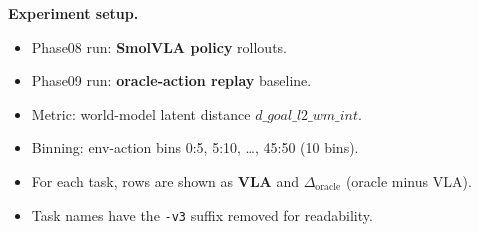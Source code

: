 
\noindent\textbf{Experiment setup.}
\begin{itemize}
\item Phase08 run: \textbf{SmolVLA policy} rollouts.
\item Phase09 run: \textbf{oracle-action replay} baseline.
\item Metric: world-model latent distance $d\_goal\_l2\_wm\_int$.
\item Binning: env-action bins 0:5, 5:10, \dots, 45:50 (10 bins).
\item For each task, rows are shown as \textbf{VLA} and \textbf{$\Delta_{\mathrm{oracle}}$} (oracle minus VLA).
\item Task names have the \texttt{-v3} suffix removed for readability.
\end{itemize}

